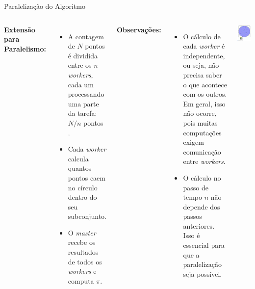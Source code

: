 \documentclass{beamer}
\begin{document}
	\begin{frame}{Paralelização do Algoritmo}
		
		\begin{columns}[T]
			\footnotesize
			\textbf{Extensão para Paralelismo:}
			\begin{itemize}
				\item A contagem de $N$  pontos  é dividida entre os $n$ \textit{workers}, cada um processando uma parte da tarefa: $N/n$ pontos .
				\item Cada \textit{worker} calcula quantos pontos caem no círculo dentro do seu subconjunto.
				\item O \textit{master} recebe os resultados de todos os \textit{workers} e computa \(\pi\).
			\end{itemize}
			
			\textbf{Observações:}
			\begin{itemize}
				\item O cálculo de cada \textit{worker} é independente, ou seja, não precisa saber o que acontece com os outros. Em geral, isso não ocorre, pois muitas computações exigem comunicação entre \textit{workers}.
				\item O cálculo no passo de tempo \(n\) não depende dos passos anteriores. Isso é essencial para que a paralelização seja possível.
			\end{itemize}
			
			\includegraphics[scale=0.4]{par_circfig.png}
		\end{columns}
	\end{frame}
	
\end{document}
